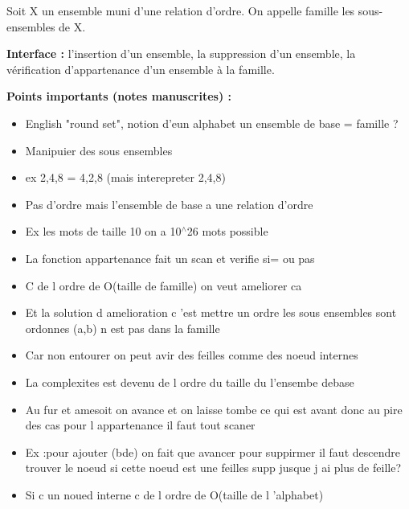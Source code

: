 \documentclass[12pt,a4paper]{article}
\begin{document}
\begin{definition}
Soit X un ensemble muni d'une relation d'ordre. On appelle famille les sous-ensembles de X.

\textbf{Interface :} l'insertion d'un ensemble, la suppression d'un ensemble, la vérification d'appartenance d'un ensemble à la famille.
\end{definition}

\begin{notecours}
\textbf{Points importants (notes manuscrites) :}
\begin{itemize}
    \item English "round set", notion d'eun alphabet un ensemble de base = famille ?
    \item Manipuier des sous ensembles
    \item ex {2,4,8} = {4,2,8} (mais interepreter {2,4,8})
    \item Pas d'ordre mais l'ensemble de base a une relation d'ordre
    \item Ex les mots de taille 10 on a 10$^{\wedge}$26 mots possible
    \item La fonction appartenance fait un scan et verifie si= ou pas
    \item C de l ordre de O(taille de famille) on veut ameliorer ca
    \item Et la solution d amelioration c 'est mettre un ordre les sous ensembles sont ordonnes (a,b) n est pas dans la famille
    \item Car non entourer on peut avir des feilles comme des noeud internes
    \item La complexites est devenu de l ordre du taille du l'ensembe debase
    \item Au fur et amesoit on avance et on laisse tombe ce qui est avant donc au pire des cas pour l appartenance il faut tout scaner
    \item Ex :pour ajouter (bde) on fait que avancer pour suppirmer il faut descendre trouver le noeud si cette noeud est une feilles supp jusque j ai plus de feille?
    \item Si c un noued interne c de l ordre de O(taille de l 'alphabet)
\end{itemize}
\end{notecours}
\end{document}
